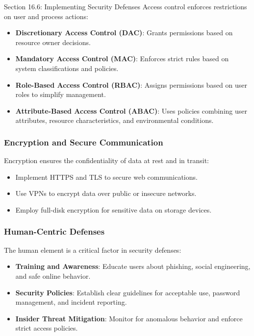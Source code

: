 \begin{notes}{Section 16.6: Implementing Security Defenses}
    Access control enforces restrictions on user and process actions:
    \begin{itemize}
        \item \textbf{Discretionary Access Control (DAC)}: Grants permissions based on resource owner decisions.
        \item \textbf{Mandatory Access Control (MAC)}: Enforces strict rules based on system classifications and policies.
        \item \textbf{Role-Based Access Control (RBAC)}: Assigns permissions based on user roles to simplify management.
        \item \textbf{Attribute-Based Access Control (ABAC)}: Uses policies combining user attributes, resource characteristics, and environmental conditions.
    \end{itemize}
    
    \subsubsection*{Encryption and Secure Communication}
    
    Encryption ensures the confidentiality of data at rest and in transit:
    \begin{itemize}
        \item Implement HTTPS and TLS to secure web communications.
        \item Use VPNs to encrypt data over public or insecure networks.
        \item Employ full-disk encryption for sensitive data on storage devices.
    \end{itemize}
    
    \subsubsection*{Human-Centric Defenses}
    
    The human element is a critical factor in security defenses:
    \begin{itemize}
        \item \textbf{Training and Awareness}: Educate users about phishing, social engineering, and safe online behavior.
        \item \textbf{Security Policies}: Establish clear guidelines for acceptable use, password management, and incident reporting.
        \item \textbf{Insider Threat Mitigation}: Monitor for anomalous behavior and enforce strict access policies.
    \end{itemize}
    

\end{notes}
